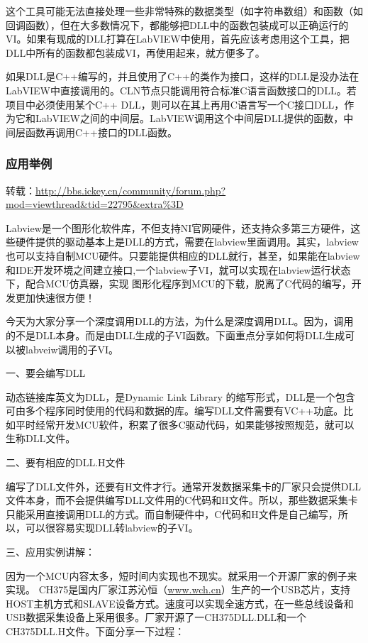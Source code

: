 这个工具可能无法直接处理一些非常特殊的数据类型（如字符串数组）和函数（如回调函数），但在大多数情况下，都能够把DLL中的函数包装成可以正确运行的VI。如果有现成的DLL打算在LabVIEW中使用，首先应该考虑用这个工具，把DLL中所有的函数都包装成VI，再使用起来，就方便多了。

如果DLL是C++编写的，并且使用了C++的类作为接口，这样的DLL是没办法在LabVIEW中直接调用的。CLN节点只能调用符合标准C语言函数接口的DLL。若项目中必须使用某个C++ DLL，则可以在其上再用C语言写一个C接口DLL，作为它和LabVIEW之间的中间层。LabVIEW调用这个中间层DLL提供的函数，中间层函数再调用C++接口的DLL函数。



\subsubsection{应用举例}
转载：\url{http://bbs.ickey.cn/community/forum.php?mod=viewthread&tid=22795&extra%3D}

Labview是一个图形化软件库，不但支持NI官网硬件，还支持众多第三方硬件，这些硬件提供的驱动基本上是DLL的方式，需要在labview里面调用。其实，labview也可以支持自制MCU硬件。只要能提供相应的DLL就行，甚至，如果能在labview和IDE开发环境之间建立接口,一个labview子VI，就可以实现在labview运行状态下，配合MCU仿真器，实现  图形化程序到MCU的下载，脱离了C代码的编写，开发更加快速很方便！

     今天为大家分享一个深度调用DLL的方法，为什么是深度调用DLL。因为，调用的不是DLL本身。而是由DLL生成的子VI函数。下面重点分享如何将DLL生成可以被labveiw调用的子VI。


一、要会编写DLL

     动态链接库英文为DLL，是Dynamic Link Library 的缩写形式，DLL是一个包含可由多个程序同时使用的代码和数据的库。编写DLL文件需要有VC++功底。比如平时经常开发MCU软件，积累了很多C驱动代码，如果能够按照规范，就可以生称DLL文件。
     
     二、要有相应的DLL.H文件
     
     编写了DLL文件外，还要有H文件才行。通常开发数据采集卡的厂家只会提供DLL文件本身，而不会提供编写DLL文件用的C代码和H文件。所以，那些数据采集卡只能采用直接调用DLL的方式。而自制硬件中，C代码和H文件是自己编写，所以，可以很容易实现DLL转labview的子VI。


三、应用实例讲解：

     因为一个MCU内容太多，短时间内实现也不现实。就采用一个开源厂家的例子来实现。
CH375是国内厂家江苏沁恒（\url{www.wch.cn}）生产的一个USB芯片，支持HOST主机方式和SLAVE设备方式。速度可以实现全速方式，在一些总线设备和USB数据采集设备上采用很多。厂家开源了一CH375DLL.DLL和一个CH375DLL.H文件。下面分享一下过程：


